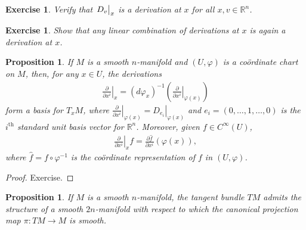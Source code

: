 \documentclass{amsart}          %
\newtheorem{proposition}[theorem]{Proposition}
\newtheorem{exercise}[theorem]{Exercise}
\newcommand{\R}{\mathbb R}
\newcommand{\pdiff}[2]{\frac{\partial #1}{\partial #2}}
\newcommand{\diff}[2]{\frac{d #1}{d #2}}
\begin{document}
\begin{exercise}
	Verify that $\left.D_v\vphantom{\diff{}{x}}\right|_x$ is a derivation at $x$ for all $x,v\in\R^n$.
\end{exercise}
\begin{exercise}
	Show that any linear combination of derivations at $x$ is again a derivation at $x$.
\end{exercise}
\begin{proposition}
	If $M$ is a smooth $n$-manifold and $(U,\varphi)$ is a co\"{o}rdinate chart on $M$, then, for any $x\in U$, the derivations\begin{align*}
	\left.\pdiff{}{x^i}\right|_x=\left(d\varphi_x\right)^{-1}\left(\left.\pdiff{}{x^i}\right|_{\varphi(x)}\right)
	\end{align*}form a basis for $T_xM$, where $\left.\pdiff{}{x^i}\right|_{\varphi(x)}=\left.D_{e_i}\right|_{\varphi(x)}$ and $e_i=(0,\dots,1,\dots,0)$ is the $i^\text{th}$ standard unit basis vector for $\R^n$. Moreover, given $f\in C^\infty(U)$,\begin{align*}
	\left.\pdiff{}{x^i}\right|_xf=\pdiff{\widehat{f}}{x^i}(\varphi(x)),
	\end{align*}where $\widehat{f}=f\circ\varphi^{-1}$ is the co\"{o}rdinate representation of $f$ in $(U,\varphi)$.
\end{proposition}
\begin{proof}
	Exercise.
\end{proof}
\begin{proposition}
	If $M$ is a smooth $n$-manifold, the tangent bundle $TM$ admits the structure of a smooth $2n$-manifold with respect to which the canonical projection map $\pi:TM\to M$ is smooth.
\end{proposition}
\end{document}
